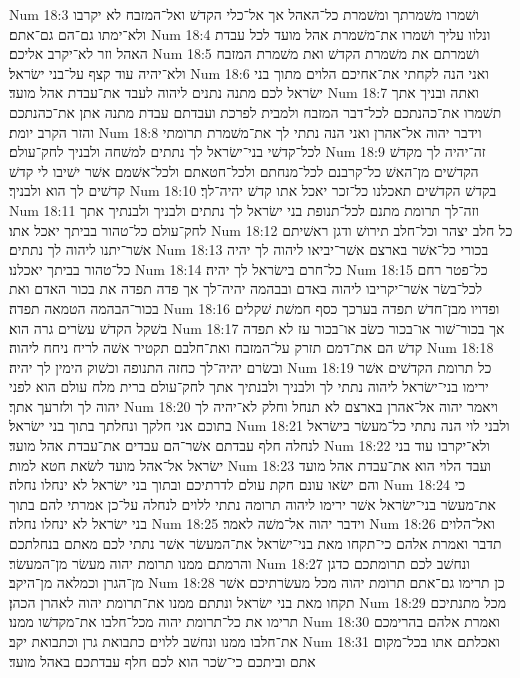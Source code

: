 Num 18:3  ושׁמרו משׁמרתך ומשׁמרת כל־האהל אך אל־כלי הקדשׁ ואל־המזבח לא יקרבו ולא־ימתו גם־הם גם־אתם׃
Num 18:4  ונלוו עליך ושׁמרו את־משׁמרת אהל מועד לכל עבדת האהל וזר לא־יקרב אליכם׃
Num 18:5  ושׁמרתם את משׁמרת הקדשׁ ואת משׁמרת המזבח ולא־יהיה עוד קצף על־בני ישׂראל׃
Num 18:6  ואני הנה לקחתי את־אחיכם הלוים מתוך בני ישׂראל לכם מתנה נתנים ליהוה לעבד את־עבדת אהל מועד׃
Num 18:7  ואתה ובניך אתך תשׁמרו את־כהנתכם לכל־דבר המזבח ולמבית לפרכת ועבדתם עבדת מתנה אתן את־כהנתכם והזר הקרב יומת׃
Num 18:8  וידבר יהוה אל־אהרן ואני הנה נתתי לך את־משׁמרת תרומתי לכל־קדשׁי בני־ישׂראל לך נתתים למשׁחה ולבניך לחק־עולם׃
Num 18:9  זה־יהיה לך מקדשׁ הקדשׁים מן־האשׁ כל־קרבנם לכל־מנחתם ולכל־חטאתם ולכל־אשׁמם אשׁר ישׁיבו לי קדשׁ קדשׁים לך הוא ולבניך׃
Num 18:10  בקדשׁ הקדשׁים תאכלנו כל־זכר יאכל אתו קדשׁ יהיה־לך׃
Num 18:11  וזה־לך תרומת מתנם לכל־תנופת בני ישׂראל לך נתתים ולבניך ולבנתיך אתך לחק־עולם כל־טהור בביתך יאכל אתו׃
Num 18:12  כל חלב יצהר וכל־חלב תירושׁ ודגן ראשׁיתם אשׁר־יתנו ליהוה לך נתתים׃
Num 18:13  בכורי כל־אשׁר בארצם אשׁר־יביאו ליהוה לך יהיה כל־טהור בביתך יאכלנו׃
Num 18:14  כל־חרם בישׂראל לך יהיה׃
Num 18:15  כל־פטר רחם לכל־בשׂר אשׁר־יקריבו ליהוה באדם ובבהמה יהיה־לך אך פדה תפדה את בכור האדם ואת בכור־הבהמה הטמאה תפדה׃
Num 18:16  ופדויו מבן־חדשׁ תפדה בערכך כסף חמשׁת שׁקלים בשׁקל הקדשׁ עשׂרים גרה הוא׃
Num 18:17  אך בכור־שׁור או־בכור כשׂב או־בכור עז לא תפדה קדשׁ הם את־דמם תזרק על־המזבח ואת־חלבם תקטיר אשׁה לריח ניחח ליהוה׃
Num 18:18  ובשׂרם יהיה־לך כחזה התנופה וכשׁוק הימין לך יהיה׃
Num 18:19  כל תרומת הקדשׁים אשׁר ירימו בני־ישׂראל ליהוה נתתי לך ולבניך ולבנתיך אתך לחק־עולם ברית מלח עולם הוא לפני יהוה לך ולזרעך אתך׃
Num 18:20  ויאמר יהוה אל־אהרן בארצם לא תנחל וחלק לא־יהיה לך בתוכם אני חלקך ונחלתך בתוך בני ישׂראל׃
Num 18:21  ולבני לוי הנה נתתי כל־מעשׂר בישׂראל לנחלה חלף עבדתם אשׁר־הם עבדים את־עבדת אהל מועד׃
Num 18:22  ולא־יקרבו עוד בני ישׂראל אל־אהל מועד לשׂאת חטא למות׃
Num 18:23  ועבד הלוי הוא את־עבדת אהל מועד והם ישׂאו עונם חקת עולם לדרתיכם ובתוך בני ישׂראל לא ינחלו נחלה׃
Num 18:24  כי את־מעשׂר בני־ישׂראל אשׁר ירימו ליהוה תרומה נתתי ללוים לנחלה על־כן אמרתי להם בתוך בני ישׂראל לא ינחלו נחלה׃
Num 18:25  וידבר יהוה אל־משׁה לאמר׃
Num 18:26  ואל־הלוים תדבר ואמרת אלהם כי־תקחו מאת בני־ישׂראל את־המעשׂר אשׁר נתתי לכם מאתם בנחלתכם והרמתם ממנו תרומת יהוה מעשׂר מן־המעשׂר׃
Num 18:27  ונחשׁב לכם תרומתכם כדגן מן־הגרן וכמלאה מן־היקב׃
Num 18:28  כן תרימו גם־אתם תרומת יהוה מכל מעשׂרתיכם אשׁר תקחו מאת בני ישׂראל ונתתם ממנו את־תרומת יהוה לאהרן הכהן׃
Num 18:29  מכל מתנתיכם תרימו את כל־תרומת יהוה מכל־חלבו את־מקדשׁו ממנו׃
Num 18:30  ואמרת אלהם בהרימכם את־חלבו ממנו ונחשׁב ללוים כתבואת גרן וכתבואת יקב׃
Num 18:31  ואכלתם אתו בכל־מקום אתם וביתכם כי־שׂכר הוא לכם חלף עבדתכם באהל מועד׃
